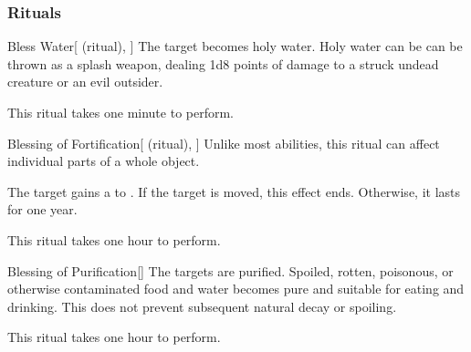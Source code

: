 \subsubsection{Rituals}


\lowercase{\hypertarget{spell:Bless Water}{}}\label{spell:Bless Water}
\begin{attuneability}[Rank 1]{\hypertarget{spell:Bless Water}{Bless Water}}[ (ritual), ]
The target becomes holy water.
Holy water can be can be thrown as a splash weapon, dealing 1d8 points of damage to a struck undead creature or an evil outsider.

This ritual takes one minute to perform.
\end{attuneability}
\vspace{0.25em}



\lowercase{\hypertarget{spell:Blessing of Fortification}{}}\label{spell:Blessing of Fortification}
\begin{attuneability}[Rank 1]{\hypertarget{spell:Blessing of Fortification}{Blessing of Fortification}}[ (ritual), ]
Unlike most abilities, this ritual can affect individual parts of a whole object.

The target gains a   to .
If the target is moved, this effect ends.
Otherwise, it lasts for one year.

This ritual takes one hour to perform.
\end{attuneability}
\vspace{0.25em}



\lowercase{\hypertarget{spell:Blessing of Purification}{}}\label{spell:Blessing of Purification}
\begin{apability}[Rank 1]{\hypertarget{spell:Blessing of Purification}{Blessing of Purification}}[]
The targets are purified.
Spoiled, rotten, poisonous, or otherwise contaminated food and water becomes pure and suitable for eating and drinking.
This does not prevent subsequent natural decay or spoiling.

This ritual takes one hour to perform.
\end{apability}
\vspace{0.25em}



